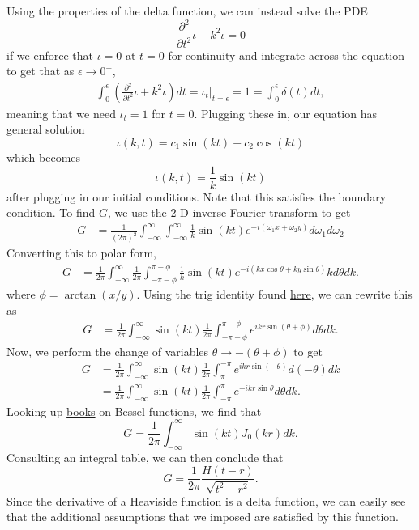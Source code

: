 \documentclass{article}
\begin{document}
Using the properties of the delta function, we can instead solve the PDE
\[
\frac{\partial^2}{\partial t^2}\iota +k^2\iota=0
\] 
if we enforce that $\iota=0$ at $t=0$ for continuity and integrate across the equation to get that as $\epsilon\to0^+$, 
\begin{align*}
\int_{0}^{\epsilon}\left(\frac{\partial^2}{\partial t^2}\iota +k^2\iota\right)dt=\iota_t\Big|_{t=\epsilon}=1=\int_{0}^{\epsilon}\delta(t)dt,
\end{align*}
meaning that we need $\iota_t=1$ for $t=0$. Plugging these in, our equation has general solution 
\[
\iota(k,t)=c_1\sin(kt)+c_2\cos(kt)
\]
which becomes 
\[
\iota(k,t)=\frac{1}{k}\sin(kt)
\]
after plugging in our initial conditions. Note that this satisfies the boundary condition. To find $G$, we use the 2-D inverse Fourier transform to get
\begin{align*}
G&=\frac{1}{(2\pi)^2}\int_{-\infty}^{\infty}\int_{-\infty}^{\infty}\frac{1}{k}\sin(kt)e^{-i(\omega_1x+\omega_2y)}d\omega_1d\omega_2%
\end{align*}
Converting this to polar form,
\begin{align*}
G&=\frac{1}{2\pi}\int_{-\infty}^{\infty}\frac{1}{2\pi}\int_{-\pi-\phi}^{\pi-\phi}\frac{1}{k}\sin(kt)e^{-i(kx\cos\theta +ky\sin\theta )}kd\theta dk.
\end{align*}
where $\phi=\arctan(x/y)$. Using the trig identity found \href{https://en.wikibooks.org/wiki/Trigonometry/Simplifying_a_sin(x)_2B_b_cos(x)}{here}, we can rewrite this as
\begin{align*}
	G&=\frac{1}{2\pi}\int_{-\infty}^{\infty}\sin(kt)\frac{1}{2\pi}\int_{-\pi-\phi}^{\pi-\phi}e^{ikr\sin(\theta+\phi)}d\theta dk.
\end{align*}
Now, we perform the change of variables $\theta\to-(\theta+\phi)$ to get
\begin{align*}
	G&=\frac{1}{2\pi}\int_{-\infty}^{\infty}\sin(kt)\frac{1}{2\pi}\int_{\pi}^{-\pi}e^{ikr\sin(-\theta)}d(-\theta)dk\\&=
	\frac{1}{2\pi}\int_{-\infty}^{\infty}\sin(kt)\frac{1}{2\pi}\int_{-\pi}^{\pi}e^{-ikr\sin\theta}d\theta dk.
\end{align*}
Looking up \href{https://i.imgur.com/mAzqFY8.jpg}{books} on Bessel functions, we find that 
\[
G = \frac{1}{2\pi}\int_{-\infty}^{\infty}\sin(kt)J_0(kr)dk.
\]
Consulting an integral table, we can then conclude that
\[
G = \frac{1}{2\pi}\frac{H(t-r)}{\sqrt{t^2-r^2}}.
\]
Since the derivative of a Heaviside function is a delta function, we can easily see that the additional assumptions that we imposed are satisfied by this function.  
\end{document}
